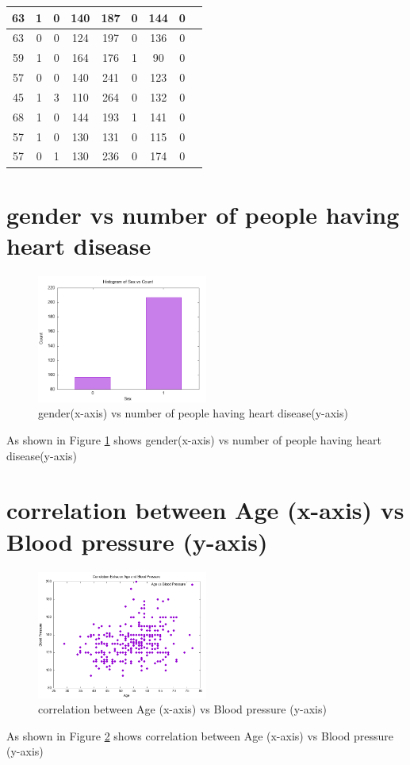\documentclass{article}
\begin{document}
\begin{longtable}{
|
c|c|c|c|c|c|c|c|c|}
\hline
63 & 1 & 0 & 140 & 187 & 0 & 144 & 0 \\
\hline
63 & 0 & 0 & 124 & 197 & 0 & 136 & 0 \\
\hline
59 & 1 & 0 & 164 & 176 & 1 & 90 & 0 \\
\hline
57 & 0 & 0 & 140 & 241 & 0 & 123 & 0 \\
\hline
45 & 1 & 3 & 110 & 264 & 0 & 132 & 0 \\
\hline
68 & 1 & 0 & 144 & 193 & 1 & 141 & 0 \\
\hline
57 & 1 & 0 & 130 & 131 & 0 & 115 & 0 \\
\hline
57 & 0 & 1 & 130 & 236 & 0 & 174 & 0 \\
\hline
\end{longtable}
\section{gender vs number of people having heart disease}
\begin{figure}[H]
\centering
\includegraphics[width=0.5\textwidth]{quest4(a).png}
\caption{gender(x-axis) vs number of people having heart disease(y-axis)}
\label{fig:image1}
\end{figure}
As shown in Figure \ref{fig:image1} shows gender(x-axis) vs number of people having heart disease(y-axis)
\section{correlation between Age (x-axis) vs Blood pressure (y-axis)}
\begin{figure}[H]
\centering
\includegraphics[width=0.5\textwidth]{ques4(b).png}
\caption{correlation between Age (x-axis) vs Blood pressure (y-axis)}
\label{fig:image2}
\end{figure}
As shown in Figure \ref{fig:image2} shows correlation between Age (x-axis) vs Blood pressure (y-axis)
\end{document}

